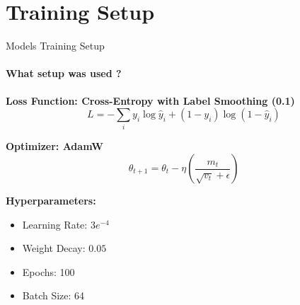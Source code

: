 \section{Training Setup}
\begin{frame}{Models Training Setup}
  \framesubtitle{What setup was used ? }
  \textbf{Loss Function: Cross-Entropy with Label Smoothing (0.1)}
  \begin{equation}
    L = - \sum_{i} y_i \log \hat{y}_i + (1 - y_i) \log (1 - \hat{y}_i)
  \end{equation}

  \textbf{Optimizer: AdamW}
  \begin{equation}
    \theta_{t+1} = \theta_t - \eta \left( \frac{m_t}{\sqrt{v_t} + \epsilon} \right)
  \end{equation}

  \textbf{Hyperparameters:}
  \begin{itemize}
    \item Learning Rate: $3e^{-4}$
    \item Weight Decay: $0.05$
    \item Epochs: 100
    \item Batch Size: 64
  \end{itemize}
\end{frame}